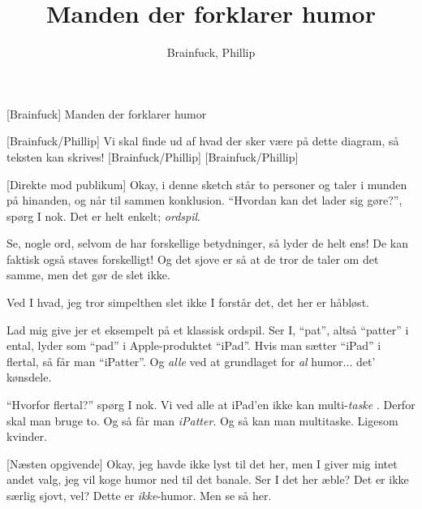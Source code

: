 \documentclass[a4paper,11pt]{article}
\title{Manden der forklarer humor}
\author{Brainfuck, Phillip}
\begin{document}
\maketitle

\begin{roles}
[Brainfuck] Manden der forklarer humor
\end{roles}

\begin{props}
[Brainfuck/Phillip] Vi skal finde ud af hvad 
der sker være på dette diagram, så teksten kan skrives!
[Brainfuck/Phillip]
[Brainfuck/Phillip]
\end{props}

\begin{sketch}


[Direkte mod publikum] Okay, i denne sketch står to personer og taler
i munden på hinanden, og når til sammen konklusion.  ``Hvordan kan det lader
sig gøre?'', spørg I nok.  Det er helt enkelt; \emph{ordspil}.

 Se, nogle ord, selvom de har forskellige betydninger, så lyder de helt
ens!  De kan faktisk også staves forskelligt!   Og det sjove er så at
de tror de taler om det samme, men det gør de slet ikke. 


 Ved I hvad, jeg tror simpelthen slet ikke I forstår det, det her er
håbløst.


 Lad mig give jer et eksempelt på et klassisk ordspil.  Ser I, ``pat'',
altså ``patter'' i ental, lyder som ``pad'' i Apple-produktet ``iPad''.  Hvis
man sætter ``iPad'' i flertal, så får man ``iPatter''. Og \emph{alle} ved at 
grundlaget for \emph{al} humor... det' kønsdele.

 ``Hvorfor flertal?'' spørg I nok.  Vi ved alle at iPad'en ikke
kan multi-\emph{taske} .
Derfor skal man bruge to.   Og så får man \emph{iPatter}.
Og så kan man multitaske.  Ligesom kvinder.


[Næsten opgivende] Okay, jeg havde ikke lyst til det her, men I giver
mig intet andet valg, jeg vil koge humor ned til det banale.  Ser I det her æble?  Det er ikke særlig sjovt, vel?
Dette er \emph{ikke}-humor.  Men se så her. 


\end{sketch}
\end{document}
